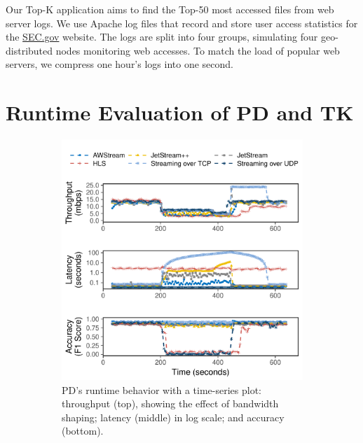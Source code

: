 \documentclass[twocolumn, 9pt]{article}
\begin{document}
Our Top-K application aims to find the Top-50 most accessed files from web
server logs. We use Apache log files that record and store user access
statistics for the \href{https://www.sec.gov}{SEC.gov} website. The logs are
split into four groups, simulating four geo-distributed nodes monitoring web
accesses. To match the load of popular web servers, we compress one hour's logs
into one second.

\section{Runtime Evaluation of PD and TK}
\label{appendix:more-runtime}

\begin{figure}[ht]
  \begin{subfigure}[t]{\columnwidth}
    \centering
    \includegraphics[width=\columnwidth]{figures/runtime_mot-timeseries.pdf}
    \caption{PD's runtime behavior with a time-series plot: throughput (top),
      showing the effect of bandwidth shaping; latency (middle) in log scale;
      and accuracy (bottom).}
    \label{fig:pd-runtime-timeseries}
  \end{subfigure}
  \vspace{1em}
  \\
  \begin{subfigure}[t]{\columnwidth}

\end{subfigure}
\end{figure}
\end{document}
